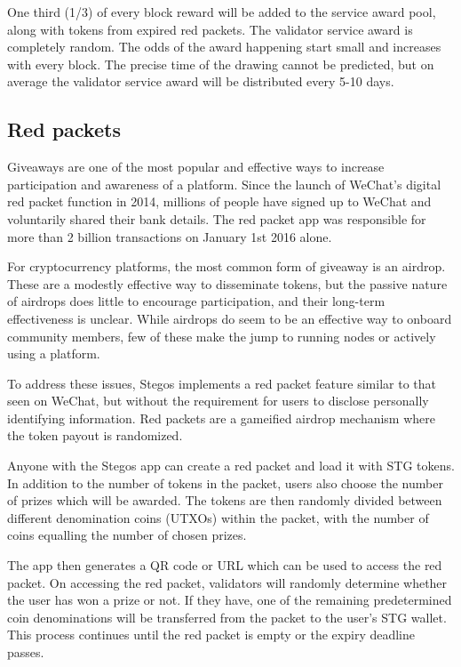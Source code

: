 \documentclass[8pt,fleqn,openany]{book}
\begin{document}
One third (1/3) of every block reward will be added to the service award pool, along with tokens from expired red packets. The validator service award is completely random. The odds of the award happening start small and increases with every block. The precise time of the drawing cannot be predicted, but on average the validator service award will be distributed every 5-10 days.

\subsection{Red packets}
Giveaways are one of the most popular and effective ways to increase participation and awareness of a platform. Since the launch of WeChat’s digital red packet function in 2014, millions of people have signed up to WeChat and voluntarily shared their bank details. The red packet app was responsible for more than 2 billion transactions on January 1st 2016 alone.

For cryptocurrency platforms, the most common form of giveaway is an airdrop. These are a modestly effective way to disseminate tokens, but the passive nature of airdrops does little to encourage participation, and their long-term effectiveness is unclear. While airdrops do seem to be an effective way to onboard community members, few of these make the jump to running nodes or actively using a platform.

To address these issues, Stegos implements a red packet feature similar to that seen on WeChat, but without the requirement for users to disclose personally identifying information. Red packets are a gameified airdrop mechanism where the token payout is randomized.

Anyone with the Stegos app can create a red packet and load it with STG tokens. In addition to the number of tokens in the packet, users also choose the number of prizes which will be awarded. The tokens are then randomly divided between different denomination coins (UTXOs) within the packet, with the number of coins equalling the number of chosen prizes. 

The app then generates a QR code or URL which can be used to access the red packet. On accessing the red packet, validators will randomly determine whether the user has won a prize or not. If they have, one of the remaining predetermined coin denominations will be transferred from the packet to the user’s STG wallet. This process continues until the red packet is empty or the expiry deadline passes.
\end{document}
